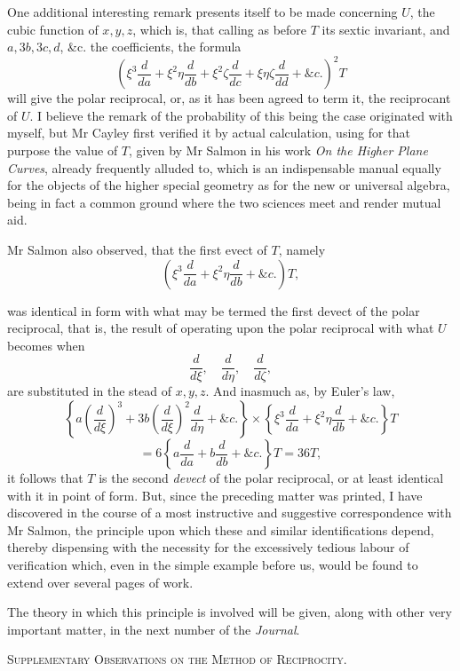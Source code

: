 \documentclass[11pt]{article}
\newcommand{\subpaperhead}[1]{\begin{center}{\large\scshape #1}\end{center}}
\newcommand{\sourcepage}[1]{\marginpar{\scriptsize p.~#1}}
\begin{document}
One additional interesting remark presents itself to be made concerning $U$, the cubic function of $x,y,z$, which is, that calling as before $T$ its sextic invariant, and $a,3b,3c,d$, \&c. the coefficients, the formula
\[
\left(\xi^3\frac{d}{da}+\xi^2\eta\frac{d}{db}
+\xi^2\zeta\frac{d}{dc}+\xi\eta\zeta\frac{d}{dd}
+\&c.\right)^2T
\]
will give the polar reciprocal, or, as it has been agreed to term it, the reciprocant of $U$. I believe the remark of the probability of this being the case originated with myself, but Mr Cayley first verified it by actual calculation, using for that purpose the value of $T$, given by Mr Salmon in his work \emph{On the Higher Plane Curves}, already frequently alluded to, which is an indispensable manual equally for the objects of the higher special geometry as for the new or universal algebra, being in fact a common ground where the two sciences meet and render mutual aid.

Mr Salmon also observed, that the first evect of $T$, namely
\[
\left(\xi^3\frac{d}{da}+\xi^2\eta\frac{d}{db}+\&c.\right)T,
\]

\sourcepage{339}
was identical in form with what may be termed the first devect of the polar reciprocal, that is, the result of operating upon the polar reciprocal with what $U$ becomes when
\[
\frac{d}{d\xi},\quad \frac{d}{d\eta},\quad \frac{d}{d\zeta},
\]
are substituted in the stead of $x,y,z$. And inasmuch as, by Euler's law,
\[
\left\{a\left(\frac{d}{d\xi}\right)^3
+3b\left(\frac{d}{d\xi}\right)^2\frac{d}{d\eta}
+\&c.\right\}
\times
\left\{\xi^3\frac{d}{da}+\xi^2\eta\frac{d}{db}+\&c.\right\}T
\]
\[
=6\left\{a\frac{d}{da}+b\frac{d}{db}+\&c.\right\}T=36T,
\]
it follows that $T$ is the second \emph{devect} of the polar reciprocal, or at least identical with it in point of form. But, since the preceding matter was printed, I have discovered in the course of a most instructive and suggestive correspondence with Mr Salmon, the principle upon which these and similar identifications depend, thereby dispensing with the necessity for the excessively tedious labour of verification which, even in the simple example before us, would be found to extend over several pages of work.

The theory in which this principle is involved will be given, along with other very important matter, in the next number of the \emph{Journal}.

\subpaperhead{Supplementary Observations on the Method of Reciprocity.}
\end{document}

